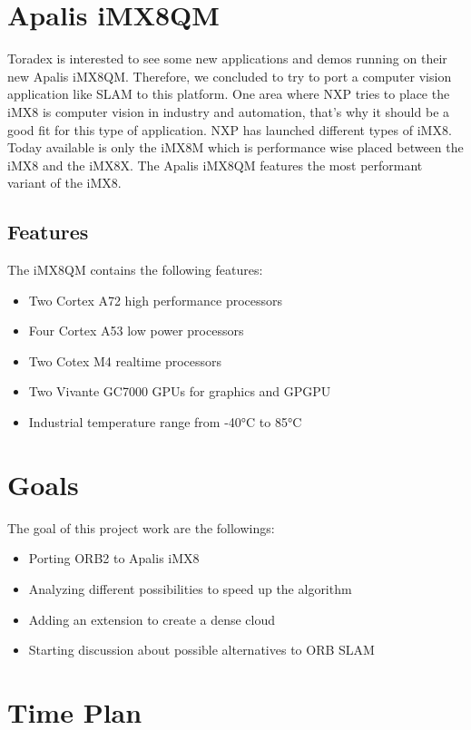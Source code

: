 \documentclass[11pt,a4paper,titlepage,oneside]{report}
\begin{document}
\section{Apalis iMX8QM}

Toradex is interested to see some new applications and demos running on their new Apalis iMX8QM. Therefore, we concluded to try to port a computer vision application like SLAM to this platform. One area where NXP tries to place the iMX8 is computer vision in industry and automation, that's why it should be a good fit for this type of application. NXP has launched different types of iMX8. Today available is only the iMX8M which is performance wise placed between the iMX8 and the iMX8X. The Apalis iMX8QM features the most performant variant of the iMX8.

\subsection{Features}

The iMX8QM contains the following features:
\begin{itemize}
  \item Two Cortex A72 high performance processors
  \item Four Cortex A53 low power processors
  \item Two Cotex M4 realtime processors 
  \item Two Vivante GC7000 GPUs for graphics and GPGPU
  \item Industrial temperature range from -40°C to 85°C
\end{itemize}

\section{Goals}
The goal of this project work are the followings:
\begin{itemize}
\item Porting ORB2 to Apalis iMX8
\item Analyzing different possibilities to speed up the algorithm
\item Adding an extension to create a dense cloud
\item Starting discussion about possible alternatives to ORB SLAM
\end{itemize}

\section{Time Plan}
\end{document}
